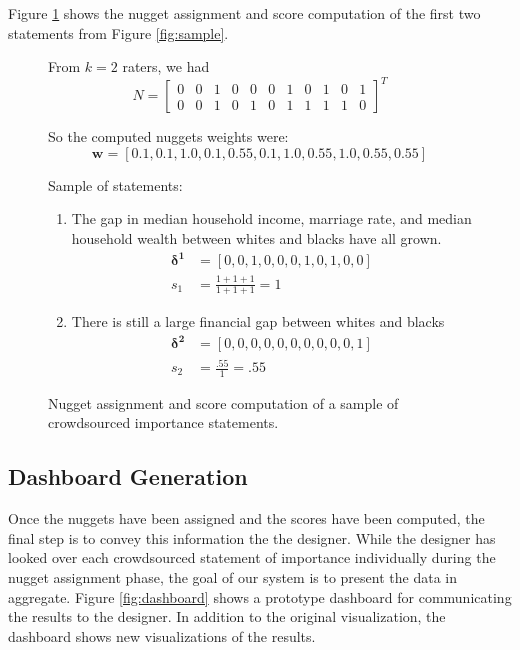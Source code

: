 \documentclass{sigchi}
\begin{document}
Figure \ref{fig:scorecomp} shows the nugget assignment and score
computation of the first two statements from Figure \ref{fig:sample}.

\setcounter{MaxMatrixCols}{20}

\begin{figure}[t]
  \begin{framed}
    From $k=2$ raters, we had
    \[
    N = \begin{bmatrix}
    0 & 0 & 1 & 0 & 0 & 0 & 1 & 0 & 1 & 0 & 1 \\
    0 & 0 & 1 & 0 & 1 & 0 & 1 & 1 & 1 & 1 & 0
    \end{bmatrix}^T
    \]

    So the computed nuggets weights were:
    \[\mathbf{w}=\left[0.1,0.1,1.0,0.1,0.55,0.1,1.0,0.55,1.0,0.55,0.55\right]\]

    Sample of statements:
    \begin{enumerate}
    \item The gap in median household income, marriage rate, and
    median household wealth between whites and blacks have all grown.
    \begin{align*}
    \mathbf{\delta^1} &= \left[0,0,1,0,0,0,1,0,1,0,0\right]\\
    s_1 &= \frac{1 + 1 + 1}{1 + 1 + 1} = 1
    \end{align*}

    \item There is still a large financial gap between whites and blacks
    \begin{align*}
    \mathbf{\delta^2} &= \left[0,0,0,0,0,0,0,0,0,0,1\right]\\
    s_2 &= \frac{.55}{1} = .55
    \end{align*}
  \end{enumerate}

  \end{framed}
  \caption{Nugget assignment and score computation of a sample of crowdsourced importance statements.}
  \label{fig:scorecomp}
\end{figure}

\subsection{Dashboard Generation}

Once the nuggets have been assigned and the scores have been computed,
the final step is to convey this information the the designer. While
the designer has looked over each crowdsourced statement of importance
individually during the nugget assignment phase, the goal of our
system is to present the data in aggregate. Figure \ref{fig:dashboard}
shows a prototype dashboard for communicating the results to the
designer. In addition to the original visualization, the dashboard
shows new visualizations of the results.
\end{document}
